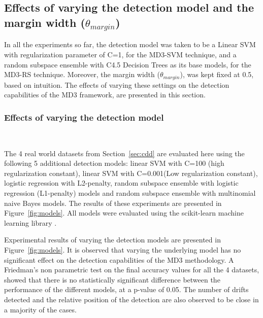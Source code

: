 \documentclass[authoryear,3p,times,twocolumn]{elsarticle}
\begin{document}
\subsection{Effects of varying the detection model and the margin width ($\theta_{margin}$)}
\label{sec:modelsmargins}

In all the experiments so far, the detection model was taken to be a Linear SVM with regularization parameter of C=1, for the MD3-SVM technique, and a random subspace ensemble with C4.5 Decision Trees as its base models, for the MD3-RS technique. Moreover, the margin width ($\theta_{margin}$), was kept fixed at 0.5, based on intuition. The effects of varying these settings on the detection capabilities of the MD3 framework, are presented in this section. 

\subsubsection{Effects of varying the detection model}
\label{sec:models} 

\begin{figure*}[t]
\centering
{}
 \\
\caption{Effect of varying the detection model on the drift detection and the prediction accuracy, over time. }
\label{fig:models}
\end{figure*}

The 4 real world datasets from Section~\ref{sec:cdd} are evaluated here using the following 5 additional detection models: linear SVM with C=100 (high regularization constant), linear SVM with C=0.001(Low regularization constant), logistic regression with L2-penalty, random subspace ensemble with logistic regression (L1-penalty) models and random subspace ensemble with multinomial naive Bayes models. The results of these experiments are presented in Figure~\ref{fig:models}. All models were evaluated using the scikit-learn machine learning library \citep{scikit-learn}. 

Experimental results of varying the detection models are presented in Figure~\ref{fig:models}. It is observed that varying the underlying model has no significant effect on the detection capabilities of the MD3 methodology. A Friedman's non parametric test \citep{demvsar2006statistical} on the final accuracy values for all the 4 datasets, showed that there is no statistically significant difference between the performance of the different models, at a p-value of 0.05. The number of drifts detected and the relative position of the detection are also observed to be close in a majority of the cases. 
\end{document}
